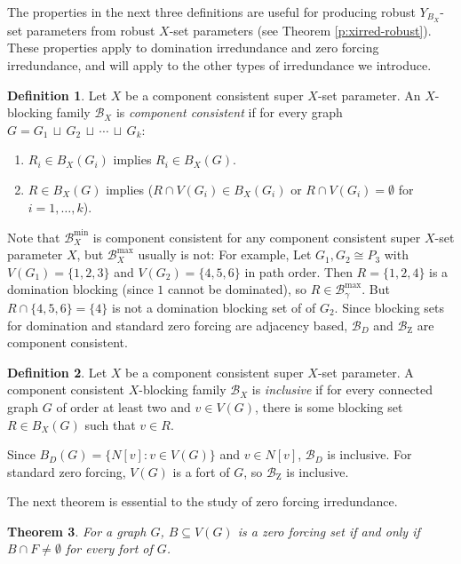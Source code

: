 \documentclass{article}
\numberwithin{figure}{section}
\numberwithin{table}{section}
\numberwithin{equation}{section}
\newtheorem{thm}{Theorem}[section]
\theoremstyle{definition}
\theoremstyle{definition}
\newtheorem{defn}[thm]{Definition}
\theoremstyle{definition}
\newcommand {\du} {\,\sqcup\,}
\newcommand{\B}{\mathcal{B}}
\newcommand{\ben}{\begin{enumerate}}
\newcommand{\een}{\end{enumerate}}
\newcommand{\Z}{\operatorname{Z}}
\begin{document}
    The  properties in the next three definitions  are useful for producing robust $Y_{B_X}$-set parameters from robust $X$-set parameters (see Theorem \ref{p:xirred-robust}). 
 These properties apply to domination irredundance and zero forcing irredundance, and will apply to the other types of irredundance we introduce.



\begin{defn}\label{d:compconsistXblock}
Let $X$ be a component consistent super $X$-set parameter.  An $X$-blocking family $\B_X$  is \emph{component consistent}  if for every graph $G=G_1\du G_2\du \cdots \du G_k$: 
\ben[$(1)$]
\item\label{26c1}  $R_i\in B_X(G_i)$ implies $R_i\in B_X(G)$.
\item\label{26c2}   $R\in B_X(G)$ implies 
($R\cap V(G_i)\in B_X(G_i)$ or $R\cap V(G_i)= \emptyset$ for $i=1,\dots,k$). 
\een\end{defn}

Note that $\B_X^{\min}$ is component consistent for any component consistent super $X$-set parameter $X$, but  $\B_X^{\max}$ usually is not: For example, Let $G_1,G_2\cong P_3$ with  $V(G_1)=\{1,2,3\}$  and $V(G_2)=\{4,5,6\}$ in path order.  Then $R=\{1,2,4\}$ is a domination blocking (since $1$ cannot be dominated), so $R\in \B_\gamma^{\max}$. But $R\cap\{4,5,6\}=\{4\}$ is not a domination blocking set of of $G_2$.
Since blocking sets for domination and standard zero forcing are adjacency based, $\B_D$ and $\B_{\Z}$ are component consistent.

\begin{defn}\label{d:inclusive}
Let $X$ be a  component consistent super $X$-set parameter. A  component consistent  $X$-blocking family $\B_X$  is \emph{inclusive}  if for every connected graph $G$ of order at least two and $v\in V(G)$, there is some blocking set $R\in B_X(G)$ such that $v\in R$. 
\end{defn}

Since $B_D(G)=\{N[v]:v\in V(G)\}$ and $v\in N[v]$, $\B_D$ is  inclusive. For standard zero forcing, $V(G)$ is a fort of $G$, so $\B_{\Z}$ is inclusive.  

   The next theorem is essential to the study of zero forcing irredundance.

\begin{thm} \label{fortthm}  {\rm \cite{BFH19}}
For a graph $G$, $B\subseteq V(G)$ is a zero forcing set if and only if $B\cap F\ne \emptyset$ for every fort of $G$.
\end{thm} 
\end{document}
